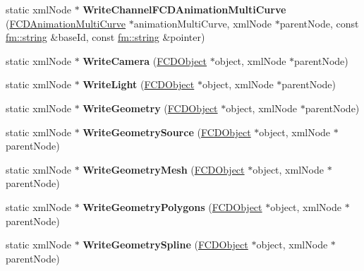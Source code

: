 \begin{DoxyCompactItemize}
\item 
\hypertarget{classFArchiveXML_a8b0242d4d276202465dfdb0711e16597}{
static xmlNode $\ast$ {\bfseries WriteChannelFCDAnimationMultiCurve} (\hyperlink{classFCDAnimationMultiCurve}{FCDAnimationMultiCurve} $\ast$animationMultiCurve, xmlNode $\ast$parentNode, const \hyperlink{classfm_1_1stringT}{fm::string} \&baseId, const \hyperlink{classfm_1_1stringT}{fm::string} \&pointer)}
\label{classFArchiveXML_a8b0242d4d276202465dfdb0711e16597}

\item 
\hypertarget{classFArchiveXML_aa9ab0dfc88b8f3938f574a727ce0acbc}{
static xmlNode $\ast$ {\bfseries WriteCamera} (\hyperlink{classFCDObject}{FCDObject} $\ast$object, xmlNode $\ast$parentNode)}
\label{classFArchiveXML_aa9ab0dfc88b8f3938f574a727ce0acbc}

\item 
\hypertarget{classFArchiveXML_abab21e81e57c7aee216bdcb53aad0ff5}{
static xmlNode $\ast$ {\bfseries WriteLight} (\hyperlink{classFCDObject}{FCDObject} $\ast$object, xmlNode $\ast$parentNode)}
\label{classFArchiveXML_abab21e81e57c7aee216bdcb53aad0ff5}

\item 
\hypertarget{classFArchiveXML_a5a5ee34dcc46b42be50c9465e40578b7}{
static xmlNode $\ast$ {\bfseries WriteGeometry} (\hyperlink{classFCDObject}{FCDObject} $\ast$object, xmlNode $\ast$parentNode)}
\label{classFArchiveXML_a5a5ee34dcc46b42be50c9465e40578b7}

\item 
\hypertarget{classFArchiveXML_a1e0c8374002209abf26706968992011e}{
static xmlNode $\ast$ {\bfseries WriteGeometrySource} (\hyperlink{classFCDObject}{FCDObject} $\ast$object, xmlNode $\ast$parentNode)}
\label{classFArchiveXML_a1e0c8374002209abf26706968992011e}

\item 
\hypertarget{classFArchiveXML_ae90893f8799568dca2ecbfe9fe7e7ae2}{
static xmlNode $\ast$ {\bfseries WriteGeometryMesh} (\hyperlink{classFCDObject}{FCDObject} $\ast$object, xmlNode $\ast$parentNode)}
\label{classFArchiveXML_ae90893f8799568dca2ecbfe9fe7e7ae2}

\item 
\hypertarget{classFArchiveXML_aea52afa594e3ba2b4fec9d957e4f0852}{
static xmlNode $\ast$ {\bfseries WriteGeometryPolygons} (\hyperlink{classFCDObject}{FCDObject} $\ast$object, xmlNode $\ast$parentNode)}
\label{classFArchiveXML_aea52afa594e3ba2b4fec9d957e4f0852}

\item 
\hypertarget{classFArchiveXML_a410cc16f1df611a827df09d014e090bc}{
static xmlNode $\ast$ {\bfseries WriteGeometrySpline} (\hyperlink{classFCDObject}{FCDObject} $\ast$object, xmlNode $\ast$parentNode)}
\label{classFArchiveXML_a410cc16f1df611a827df09d014e090bc}


\end{DoxyCompactItemize}
